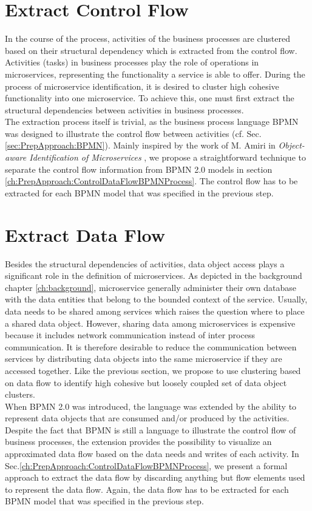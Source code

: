 \section{Extract Control Flow}
\label{sec:Solution:ExtractControlFlow}
In the course of the process, activities of the business processes are clustered based on their structural dependency which is extracted from the control flow. Activities (tasks) in business processes play the role of operations in microservices, representing the functionality a service is able to offer. During the process of microservice identification, it is desired to cluster high cohesive functionality into one microservice. To achieve this, one must first extract the structural  dependencies between activities in business processes. \\
The extraction process itself is trivial, as the business process language BPMN was designed to illustrate the control flow between activities (cf. Sec.\ref{sec:PrepApproach:BPMN}). Mainly inspired by the work of M. Amiri in \textit{Object-aware Identification of Microservices} \cite{ObjectAwareAmiri}, we propose a straightforward technique to separate the control flow information from BPMN 2.0 models in section \ref{ch:PrepApproach:ControlDataFlowBPMNProcess}. The control flow has to be extracted for each BPMN model that was specified in the previous step.




\section{Extract Data Flow}
\label{sec:Solution:ExtractDataFlow}
Besides the structural dependencies of activities, data object access plays a significant role in the definition of microservices. As depicted in the background chapter \ref{ch:background}, microservice generally administer their own database with the data entities that belong to the bounded context of the service. Usually, data needs to be shared among services which raises the question where to place a shared data object. However, sharing data among microservices is expensive because it includes network communication instead of inter process communication. It is therefore desirable to reduce the communication between services by distributing data objects into the same microservice if they are accessed together.  
Like the previous section, we propose to use clustering based on data flow to identify high cohesive but loosely coupled set of data object clusters. \\
When BPMN 2.0 was introduced, the language was extended by the ability to represent data objects that are consumed and/or produced by the activities. Despite the fact that BPMN is still a language to illustrate the control flow of business processes, the extension provides the possibility to visualize an approximated data flow based on the data needs and writes of each activity. In Sec.\ref{ch:PrepApproach:ControlDataFlowBPMNProcess}, we present a formal approach to extract the data flow by discarding anything but flow elements used to represent the data flow. Again, the data flow has to be extracted for each BPMN model that was specified in the previous step.



